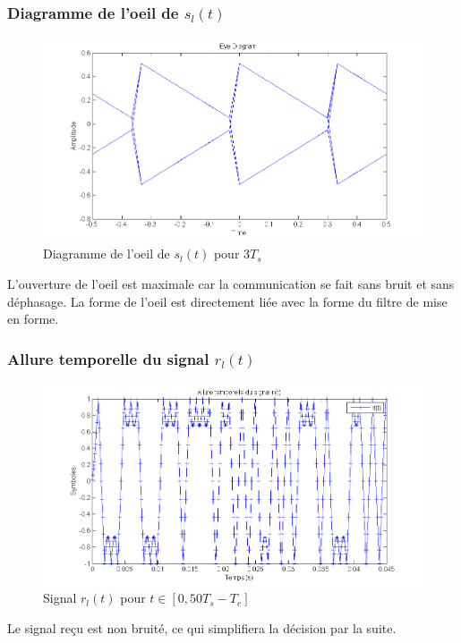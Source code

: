 \documentclass[11pt]{article}
\begin{document}
		\subsubsection{Diagramme de l'oeil de $s_l(t)$}
			\begin{figure}[h]
				\centering
				\includegraphics[scale=0.5]{images/Q318-2.png}
				\caption{Diagramme de l'oeil de $s_l(t)$ pour $3T_s$}
				\label{Q318-2}
			\end{figure}
			L'ouverture de l'oeil est maximale car la communication se fait sans bruit et sans déphasage. La forme de l'oeil est directement liée avec la forme du filtre de mise en forme.
		\newpage
		\subsubsection{Allure temporelle du signal $r_l(t)$}
			\begin{figure}[h]
				\centering
				\includegraphics[scale=0.5]{images/Q318-3.png}
				\caption{Signal $r_l(t)$ pour $t \in [0, 50T_s-T_e]$}
				\label{Q318-3}
			\end{figure}
			Le signal reçu est non bruité, ce qui simplifiera la décision par la suite.
\end{document}
